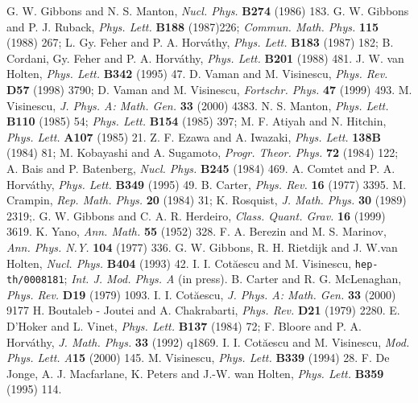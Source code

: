 \documentclass[a4paper,12pt]{article}
\begin{document}
\begin{thebibliography}{99}
G. W. Gibbons and N. S. Manton,
{\em Nucl. Phys.} {\bf B274} (1986) 183.
G. W. Gibbons and P. J. Ruback, 
{\em Phys. Lett.} {\bf B188} (1987)226;
{\em Commun. Math. Phys.} {\bf 115} (1988) 267;
L. Gy. Feher and P. A. Horv\' athy, 
{\em Phys. Lett.} {\bf B183} (1987) 182; 
B. Cordani, Gy. Feher and P. A. Horv\' athy,
{\em Phys. Lett.} {\bf B201} (1988) 481.
J. W. van Holten, {\em Phys. Lett.} {\bf B342} (1995) 47.
D. Vaman and M. Visinescu, 
{\em Phys. Rev.} {\bf D57} (1998) 3790;
D. Vaman and M. Visinescu, 
{\em Fortschr. Phys.} {\bf 47} (1999) 493.
M. Visinescu,
{\em J. Phys. A: Math. Gen.} {\bf 33} (2000) 4383.
N. S. Manton,
{\em Phys. Lett.} {\bf B110} (1985) 54; 
{\em Phys. Lett.} {\bf B154} (1985) 397; 
M. F. Atiyah and  N. Hitchin, {\em Phys. Lett. } {\bf A107} (1985) 21.
Z. F. Ezawa and A. Iwazaki, {\em Phys. Lett.} {\bf 138B} (1984) 81; 
M. Kobayashi and A. Sugamoto, {\em Progr. Theor. Phys.} {\bf 72} (1984) 
122; A. Bais and P. Batenberg, {\em Nucl. Phys.} {\bf B245} (1984) 469.
A. Comtet and P. A. Horv\' athy, {\em Phys. Lett.} {\bf B349} (1995) 49.
B. Carter, {\em Phys. Rev.} {\bf 16} (1977) 3395.
M. Crampin, {\em Rep. Math. Phys.} {\bf 20} (1984) 31;
K. Rosquist, {\em J. Math. Phys.} {\bf 30} (1989) 2319;.
G. W. Gibbons and C. A. R. Herdeiro, {\em Class. Quant. Grav.}
{\bf 16} (1999) 3619.
K. Yano, 
{\em Ann. Math.} {\bf 55} (1952) 328.
F. A. Berezin and M. S. Marinov, 
{\em Ann. Phys. N.Y.} {\bf 104} (1977) 336.
G. W. Gibbons, R. H. Rietdijk and J. W.van Holten, 
{\em Nucl. Phys.} {\bf B404} (1993) 42.
I. I. Cot\u aescu and M. Visinescu,
{\tt hep-th/0008181}; {\em Int. J. Mod. Phys. A} (in press).
B. Carter and R. G. McLenaghan, {\em Phys. Rev.} {\bf D19} (1979) 1093.
I. I. Cot\u aescu, {\em J. Phys. A: Math. Gen.} {\bf 33} (2000) 9177 
H. Boutaleb - Joutei and A. Chakrabarti, {\em Phys. Rev.} {\bf D21} (1979)
2280.
E. D'Hoker and L. Vinet, {\em Phys. Lett.} {\bf B137} (1984) 72;
F. Bloore and P. A. Horv\' athy, {\em J. Math. Phys.} {\bf 33} (1992) 
q1869.  
I. I. Cot\u aescu and M. Visinescu,
{\em Mod. Phys. Lett. A}{\bf 15} (2000) 145.
M. Visinescu, {\em Phys. Lett.} {\bf B339} (1994) 28.
F. De Jonge, A. J. Macfarlane, K. Peters and J.-W. wan Holten, 
{\em Phys. Lett.}  {\bf B359} (1995) 114.

\end{thebibliography}
\end{document}
